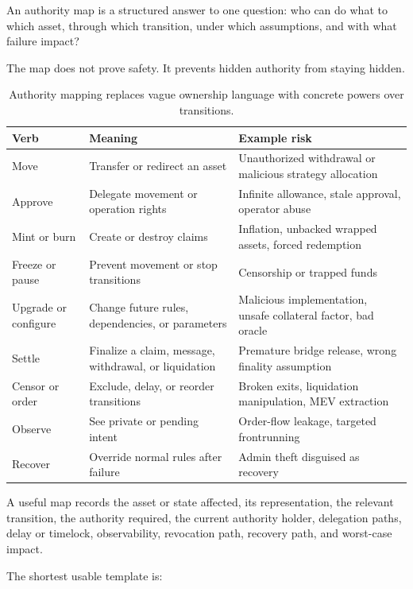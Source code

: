 An authority map is a structured answer to one question: who can do what to which asset, through which transition, under which assumptions, and with what failure impact?

The map does not prove safety. It prevents hidden authority from staying hidden.

\begin{table}[htbp]
\centering
\small
\renewcommand{\arraystretch}{1.18}
\begin{tabularx}{\textwidth}{@{}>{\RaggedRight\arraybackslash}p{}>{\RaggedRight\arraybackslash}p{}X@{}}
\toprule
Verb & Meaning & Example risk \\
\midrule
Move & Transfer or redirect an asset & Unauthorized withdrawal or malicious strategy allocation \\
Approve & Delegate movement or operation rights & Infinite allowance, stale approval, operator abuse \\
Mint or burn & Create or destroy claims & Inflation, unbacked wrapped assets, forced redemption \\
Freeze or pause & Prevent movement or stop transitions & Censorship or trapped funds \\
Upgrade or configure & Change future rules, dependencies, or parameters & Malicious implementation, unsafe collateral factor, bad oracle \\
Settle & Finalize a claim, message, withdrawal, or liquidation & Premature bridge release, wrong finality assumption \\
Censor or order & Exclude, delay, or reorder transitions & Broken exits, liquidation manipulation, MEV extraction \\
Observe & See private or pending intent & Order-flow leakage, targeted frontrunning \\
Recover & Override normal rules after failure & Admin theft disguised as recovery \\
\bottomrule
\end{tabularx}
\caption{Authority mapping replaces vague ownership language with concrete powers over transitions.}
\end{table}

A useful map records the asset or state affected, its representation, the relevant transition, the authority required, the current authority holder, delegation paths, delay or timelock, observability, revocation path, recovery path, and worst-case impact.

The shortest usable template is:


